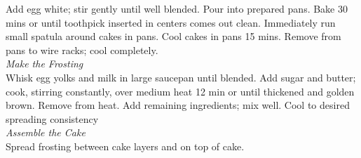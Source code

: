 \begin{recipe}[preparationtime= 2 hours 25 minutes, source = Meghan]
{		\step Add egg white; stir gently until well blended. Pour into prepared pans. 
		\step Bake 30 mins or until toothpick inserted in centers comes out clean. Immediately run small spatula around cakes in pans. Cool cakes in pans 15 mins. Remove from pans to wire racks; cool completely.\\
		\newline
		\textit{Make the Frosting}\\
		\step Whisk egg yolks and milk in large saucepan until blended.
		\step Add sugar and butter; cook, stirring constantly, over medium heat 12 min or until thickened and golden brown. Remove from heat.
		\step Add remaining ingredients; mix well. Cool to desired spreading consistency\\
		\newline
		\textit{Assemble the Cake}\\
		\step Spread frosting between cake layers and on top of cake.
}
\end{recipe}

